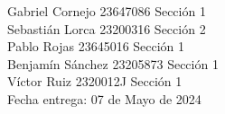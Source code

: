 \documentclass[letterpaper]{article}
\begin{document}
	\vspace*{30mm}
	\flushright 
	
	Gabriel Cornejo 23647086 Sección 1\\
	Sebastián Lorca 23200316 Sección 2\\
	Pablo Rojas 23645016 Sección 1\\
	Benjamín Sánchez  23205873 Sección 1\\
	Víctor Ruiz 2320012J Sección 1\\
	
	
	\vspace*{5mm}
	{\large Fecha entrega: 07 de Mayo de 2024\\}
	
	\newpage
	\begin{flushleft}
		\tableofcontents
	\end{flushleft}
	
\end{document}

